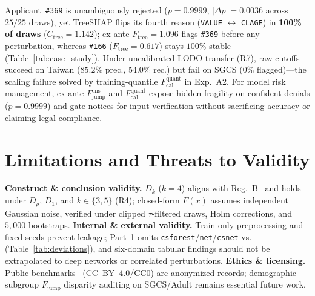 \documentclass[conference]{IEEEtran}
\begin{document}
Applicant~\texttt{\#369} is unambiguously rejected ($p{=}0.9999$, $\overline{|\Delta p|}{=}0.0036$ across $25/25$ draws), yet TreeSHAP flips its fourth reason (\texttt{VALUE} $\leftrightarrow$ \texttt{CLAGE}) in \textbf{100\% of draws} ($C_{\mathrm{tree}}{=}1.142$); ex-ante $F_{\mathrm{tree}}{=}1.096$ flags \texttt{\#369} before any perturbation, whereas \texttt{\#166} ($F_{\mathrm{tree}}{=}0.617$) stays $100\%$ stable (Table~\ref{tab:case_study}). Under uncalibrated LODO transfer (R7), raw cutoffs succeed on Taiwan ($85.2\%$ prec., $54.0\%$ rec.) but fail on SGCS ($0\%$ flagged)---the scaling failure solved by training-quantile $F_{\mathrm{cal}}^{\mathrm{quant}}$ in Exp.~A2. For model risk management, ex-ante $F_{\mathrm{jump}}^{\mathrm{ens}}$ and $F_{\mathrm{cal}}^{\mathrm{quant}}$ expose hidden fragility on confident denials ($p{=}0.9999$) and gate notices for input verification without sacrificing accuracy or claiming legal compliance.

\section{Limitations and Threats to Validity}
\label{sec:limitations}

\textbf{Construct \& conclusion validity.} $D_k$ ($k{=}4$) aligns with Reg.~B~\cite{regb_cfpb} and holds under $D_\rho$, $D_1$, and $k{\in}\{3,5\}$ (R4); closed-form $F(x)$ assumes independent Gaussian noise, verified under clipped $\tau$-filtered draws, Holm corrections, and $5{,}000$ bootstraps.
\textbf{Internal \& external validity.} Train-only preprocessing and fixed seeds prevent leakage; Part~1 omits \texttt{csforest}/\texttt{net}/\texttt{csnet} vs.~\cite{ballegeer2025} (Table~\ref{tab:deviations}), and six-domain tabular findings should not be extrapolated to deep networks or correlated perturbations.
\textbf{Ethics \& licensing.} Public benchmarks~\cite{baesens2016,sgcs2019,yeh2009,vanschoren2014} (CC~BY~4.0/CC0) are anonymized records; demographic subgroup $F_{\mathrm{jump}}$ disparity auditing on SGCS/Adult remains essential future work.

\end{document}
